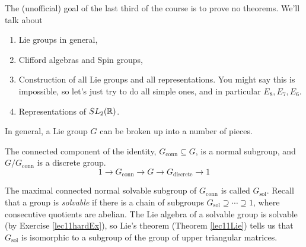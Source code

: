  \setcounter{lecture}{21}
  

 The (unofficial) goal of the last third of the course is to prove no theorems. We'll
 talk about
 \begin{enumerate}
 \item Lie groups in general,
 \item Clifford algebras and Spin groups,
 \item Construction of all Lie groups and all representations. You might say this
 is impossible, so let's just try to do all simple ones, and in particular
 $E_8,E_7,E_6$.
 \item Representations of $SL_2(\mathbb{R})$. %
 \end{enumerate}



 In general, a Lie group $G$ can be broken up into a number of pieces.

 The connected component of the identity, $G_\text{conn}\subseteq G$, is a
 normal subgroup, and $G/G_\text{conn}$ is a discrete group.
 \[
      1\longrightarrow G_\text{conn} \longrightarrow G \longrightarrow
      G_\text{discrete}\longrightarrow 1
 \]

 The maximal connected normal solvable subgroup of $G_\text{conn}$ is called
 $G_\text{sol}$. Recall that a group is \emph{solvable} if there
 is a chain of subgroups $G_\text{sol}\supseteq \cdots\supseteq 1$, where consecutive
 quotients are abelian. The Lie algebra of a solvable group is solvable (by Exercise
 \ref{lec11hardEx}), so Lie's theorem (Theorem \ref{lec11Lie}) tells us that
 $G_\text{sol}$ is isomorphic to a subgroup of the group of upper triangular
 matrices.

